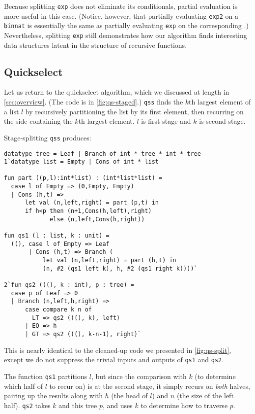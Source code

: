 Because splitting \texttt{exp} does not eliminate its conditionals, partial
evaluation is more useful in this case. (Notice, however, that partially
evaluating \texttt{exp2} on a \texttt{binnat} is essentially the same as 
partially evaluating \texttt{exp} on the corresponding \rmint.) Nevertheless,
splitting \texttt{exp} still demonstrates how our algorithm finds interesting
data structures latent in the structure of recursive functions.

\subsection{Quickselect}
\label {sec:exampleQS}

Let us return to the quickselect algorithm, which we discussed at
length in \ref{sec:overview}. (The code is in \ref{fig:qs-staged}.)
\texttt{qss} finds the $k$th largest element of a list $l$ by
recursively partitioning the list by its first element, then recurring
on the side containing the $k$th largest element. $l$ is first-stage and $k$ is
second-stage.

Stage-splitting \texttt{qss} produces:
%
\begin{lstlisting} 
datatype tree = Leaf | Branch of int * tree * int * tree
1`datatype list = Empty | Cons of int * list

fun part ((p,l):int*list) : (int*list*list) = 
  case l of Empty => (0,Empty, Empty) 
  | Cons (h,t) => 
      let val (n,left,right) = part (p,t) in 
      if h<p then (n+1,Cons(h,left),right) 
             else (n,left,Cons(h,right))

fun qs1 (l : list, k : unit) = 
  ((), case l of Empty => Leaf
       | Cons (h,t) => Branch (
           let val (n,left,right) = part (h,t) in
           (n, #2 (qs1 left k), h, #2 (qs1 right k))))`

2`fun qs2 (((), k : int), p : tree) = 
  case p of Leaf => 0
  | Branch (n,left,h,right) =>
      case compare k n of 
        LT => qs2 (((), k), left) 
      | EQ => h 
      | GT => qs2 (((), k-n-1), right)`
\end{lstlisting}
%
This is nearly identical to the cleaned-up code we presented in
\ref{fig:qs-split}, except we do not suppress the trivial inputs and outputs of 
\texttt{qs1} and \texttt{qs2}.

The function \texttt{qs1} partitions $l$, but since the comparison with $k$ (to
determine which half of $l$ to recur on) is at the second stage, it simply
recurs on \emph{both} halves, pairing up the results along with $h$ (the head of
$l$) and $n$ (the size of the left half). \texttt{qs2} takes $k$ and this tree
$p$, and uses $k$ to determine how to traverse $p$.

